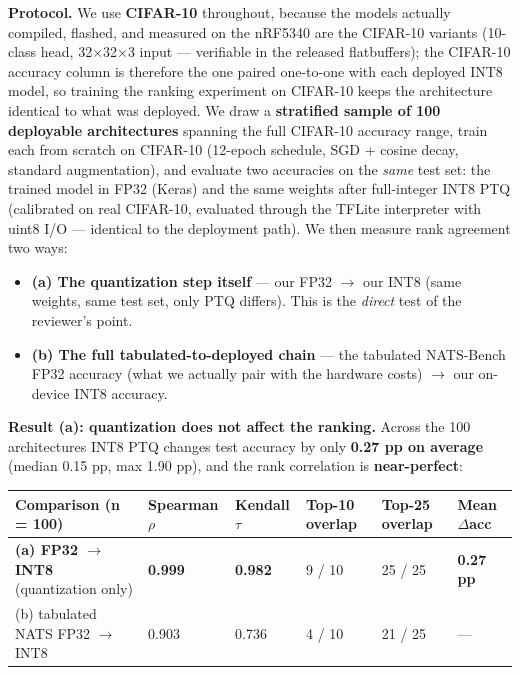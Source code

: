 \documentclass[11pt]{article}
\begin{document}
\textbf{Protocol.} We use \textbf{CIFAR-10} throughout, because the models actually compiled, flashed, and measured on the nRF5340 are the CIFAR-10 variants (10-class head, 32$\times$32$\times$3 input --- verifiable in the released flatbuffers); the CIFAR-10 accuracy column is therefore the one paired one-to-one with each deployed INT8 model, so training the ranking experiment on CIFAR-10 keeps the architecture identical to what was deployed. We draw a \textbf{stratified sample of 100 deployable architectures} spanning the full CIFAR-10 accuracy range, train each from scratch on CIFAR-10 (12-epoch schedule, SGD + cosine decay, standard augmentation), and evaluate two accuracies on the \textit{same} test set: the trained model in FP32 (Keras) and the same weights after full-integer INT8 PTQ (calibrated on real CIFAR-10, evaluated through the TFLite interpreter with uint8 I/O --- identical to the deployment path). We then measure rank agreement two ways:


\begin{itemize}\setlength{\itemsep}{2pt}
\item \textbf{(a) The quantization step itself} --- our FP32 $\to$ our INT8 (same weights, same test set, only PTQ differs). This is the \textit{direct} test of the reviewer's point.
\item \textbf{(b) The full tabulated-to-deployed chain} --- the tabulated NATS-Bench FP32 accuracy (what we actually pair with the hardware costs) $\to$ our on-device INT8 accuracy.
\end{itemize}

\textbf{Result (a): quantization does not affect the ranking.} Across the 100 architectures INT8 PTQ changes test accuracy by only \textbf{0.27 pp on average} (median 0.15 pp, max 1.90 pp), and the rank correlation is \textbf{near-perfect}:


\begin{center}\footnotesize\setlength{\tabcolsep}{4pt}
\begin{tabular}{llllll}
\toprule
Comparison (n = 100) & Spearman $\rho$ & Kendall $\tau$ & Top-10 overlap & Top-25 overlap & Mean \textbar{}$\Delta$acc\textbar{} \\
\midrule
\textbf{(a) FP32 $\to$ INT8} (quantization only) & \textbf{0.999} & \textbf{0.982} & 9 / 10 & 25 / 25 & \textbf{0.27 pp} \\
(b) tabulated NATS FP32 $\to$ INT8 & 0.903 & 0.736 & 4 / 10 & 21 / 25 & --- \\
\bottomrule
\end{tabular}
\end{center}
\end{document}
